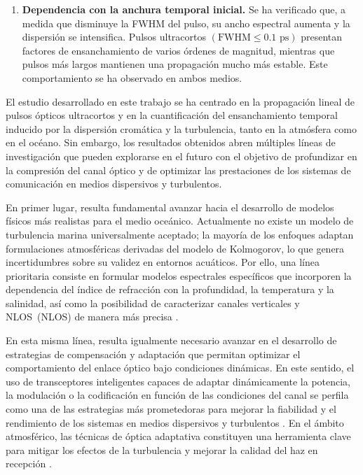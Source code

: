\begin{enumerate}
\item \textbf{Dependencia con la anchura temporal inicial.} Se ha verificado que, a medida que disminuye la FWHM del pulso, su ancho espectral aumenta y la dispersión se intensifica. Pulsos ultracortos $(\text{FWHM} \leq 0.1 \text{ ps})$ presentan factores de ensanchamiento de varios órdenes de magnitud, mientras que pulsos más largos mantienen una propagación mucho más estable. Este comportamiento se ha observado en ambos medios.

\end{enumerate}


El estudio desarrollado en este trabajo se ha centrado en la propagación lineal de pulsos ópticos ultracortos y en la cuantificación del ensanchamiento temporal inducido por la dispersión cromática y la turbulencia, tanto en la atmósfera como en el océano. Sin embargo, los resultados obtenidos abren múltiples líneas de investigación que pueden explorarse en el futuro con el objetivo de profundizar en la compresión del canal óptico y de optimizar las prestaciones de los sistemas de comunicación en medios dispersivos y turbulentos.

En primer lugar, resulta fundamental avanzar hacia el desarrollo de modelos físicos más realistas para el medio oceánico. Actualmente no existe un modelo de turbulencia marina universalmente aceptado; la mayoría de los enfoques adaptan formulaciones atmosféricas derivadas del modelo de Kolmogorov, lo que genera incertidumbres sobre su validez en entornos acuáticos. Por ello, una línea prioritaria consiste en formular modelos espectrales específicos que incorporen la dependencia del índice de refracción con la profundidad, la temperatura y la salinidad, así como la posibilidad de caracterizar canales verticales y \acs{NLOS}~(\acl{NLOS}) de manera más precisa \cite{Zeng}.

En esta misma línea, resulta igualmente necesario avanzar en el desarrollo de estrategias de compensación y adaptación que permitan optimizar el comportamiento del enlace óptico bajo condiciones dinámicas. En este sentido, el uso de transceptores inteligentes capaces de adaptar dinámicamente la potencia, la modulación o la codificación en función de las condiciones del canal se perfila como una de las estrategias más prometedoras para mejorar la fiabilidad y el rendimiento de los sistemas en medios dispersivos y turbulentos \cite{Zeng}. En el ámbito atmosférico, las técnicas de óptica adaptativa constituyen una herramienta clave para mitigar los efectos de la turbulencia y mejorar la calidad del haz en recepción \cite{Trichili}.

